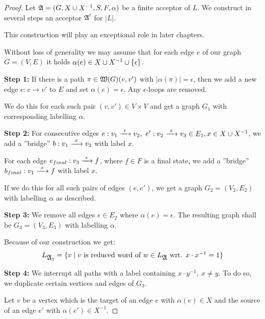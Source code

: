\begin{proof}
Let $\mbox{$\mathfrak{A}$} = (G, X \cup {X}^{-1}, S, F, \alpha)$ be a finite acceptor of $L$. We
construct in several steps an acceptor $\mbox{$\mathfrak{A}$}'$ for $|L|$.

This construction will play an exceptional role in later chapters.

Without loss of generality we may assume that for each edge $e$ of our graph $G
= (V, E)$ it holds $\alpha(e) \in X \cup {X}^{-1} \cup \mbox{$\{\epsilon\}$}$.

{\bf Step 1:} If there is a path $\pi \in \mbox{$\mathfrak{W}(G)$}(v, v')$ with
$|\alpha(\pi)| = \epsilon$, then we add a new edge $e: v \to v'$ to $E$ and set
$\alpha(e) = \epsilon$. Any $\epsilon$-loops are removed.

\begin{center}

\end{center}

We do this for each such pair $(v, v')\in V \times V$ and get a graph $G_1$ with
corresponding labelling $\alpha$.

{\bf Step 2:} For consecutive edges $e: v_1 \xrightarrow{\ {\epsilon}\ } v_2,\ e': v_2
\xrightarrow{\ {x}\ } v_3 \in E_1, x \in X \cup {X}^{-1}$, we add a ''bridge'' $b: v_1 \xrightarrow{\ {x}\ }
v_3$ with label $x$.

For each edge $e_{final}: v_3 \xrightarrow{\ {\epsilon}\ } f$, where $f \in F$ is a final
state, we add a ''bridge'' $b_{final}: v_1 \xrightarrow{\ {x}\ } f$ with label $x$.

\begin{center}

\end{center}

If we do this for all such pairs of edges $(e, e')$, we get a graph
$G_2=(V_2,E_2)$ with labelling $\alpha$ as described.

{\bf Step 3:} We remove all edges $e \in E_2$ where $\alpha(e) = \epsilon$. The
resulting graph shall be $G_3=(V_3,E_3)$ with labelling $\alpha$.

Because of our construction we get:
\[ L_{\mbox{$\mathfrak{A}$}_3} = \mbox{$\{v \mid v \mbox{ is reduced word of } w \in
L_{\mbox{$\mathfrak{A}$}} \mbox{ wrt. } x \cdot x^{-1} = 1\}$} \]

{\bf Step 4:} We interrupt all paths with a label containing $x \cdot y^{-1},\
x\neq y$. To do so, we duplicate certain vertices and edges of $G_3$.

Let $v$ be a vertex which is the target of an edge $e$ with $\alpha(e) \in X$
and the source of an edge $e'$ with $\alpha(e') \in X^{-1}$.


\end{proof}
